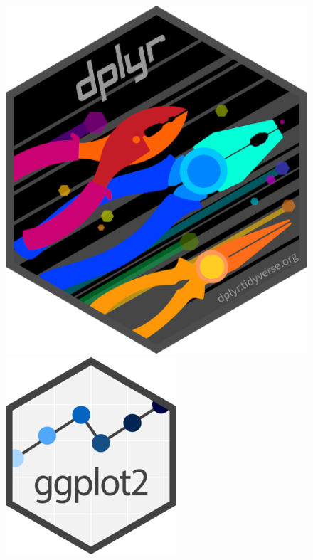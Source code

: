 \documentclass[aspectratio=169]{beamer}
\begin{document}
\begin{frame}
\begin{columns}
\begin{column}{0.5\linewidth}
\begin{figure}[h]
                \includegraphics[width=0.24\linewidth]{./logos/dplyr.png}
                \includegraphics[width=0.24\linewidth]{./logos/ggplot2_logo.png}
            \end{figure}
        \end{column}
    \end{columns}
\end{frame}
\end{document}
